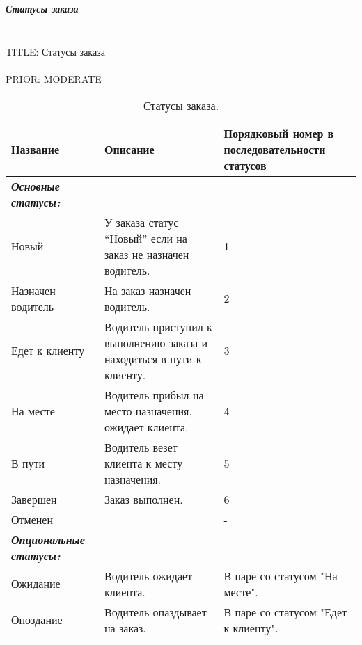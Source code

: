     \subparagraph{Статусы заказа} \mbox{} \\

    	TITLE: Статусы заказа\\
		\\
		PRIOR: MODERATE\\



    	\begin{table}
			\begin{center}
			\caption {Статусы заказа.}
			\label{table_order_status}
			\setlength{\extrarowheight}{2mm}
			\begin{tabular}{|p{3cm}|p{9cm}|p{3cm}|}

			\hline     \textbf{Название} & \textbf{Описание} & \textbf{Порядковый номер в последовательности статусов}\\ [2mm]

			\hline \textit{\textbf{Основные статусы:}}  &  & \\ [2mm]

			\hline Новый  

				& У заказа статус “Новый” если на заказ не назначен водитель. 
				& 1 \\ [2mm]

			\hline Назначен водитель  
				& На заказ назначен водитель.  
				& 2 \\ [2mm]

			\hline Едет к клиенту 
				& Водитель приступил к выполнению заказа и находиться в пути к клиенту. 
				& 3 \\ [2mm]

			\hline На месте  
				& Водитель прибыл на место назначения, ожидает клиента. 
				& 4\\ [2mm]

			\hline В пути  
				& Водитель везет клиента к месту назначения. 
				& 5\\ [2mm]

			\hline Завершен  
				& Заказ выполнен. 
				& 6\\ [2mm]

			\hline Отменен  &  & - \\ [2mm]

			\hline \textit{\textbf{Опциональные статусы:}}  &  & \\ [2mm]

			\hline Ожидание  & Водитель ожидает клиента. & В паре со статусом "На месте".\\ [2mm]
			\hline Опоздание  & Водитель опаздывает на заказ. & В паре со статусом "Едет к клиенту".\\ [2mm]
			\hline
			\end{tabular}
			\end{center}
		\end{table}
